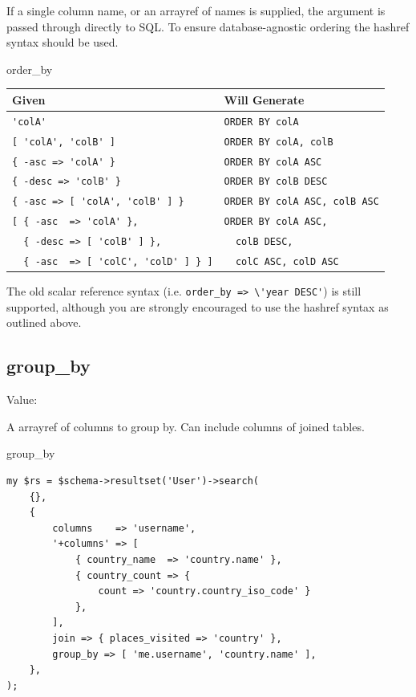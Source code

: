 If a single column name, or an arrayref of names is supplied, the argument
is passed through directly to SQL. To ensure database-agnostic ordering the
hashref syntax should be used.

\begin{frame}[fragile]{order\_by}
\begin{table}
\begin{tabular}{l | l}
Given & Will Generate \\
\hline
\footnotesize{\verb|'colA'|                         } & \footnotesize{\verb|ORDER BY colA|              } \\
\footnotesize{\verb|[ 'colA', 'colB' ]|             } & \footnotesize{\verb|ORDER BY colA, colB|        } \\
\footnotesize{\verb|{ -asc => 'colA' }|             } & \footnotesize{\verb|ORDER BY colA ASC|          } \\
\footnotesize{\verb|{ -desc => 'colB' }|            } & \footnotesize{\verb|ORDER BY colB DESC|         } \\
\footnotesize{\verb|{ -asc => [ 'colA', 'colB' ] }| } & \footnotesize{\verb|ORDER BY colA ASC, colB ASC|} \\
\footnotesize{\verb|[ { -asc  => 'colA' },|           } &   \footnotesize{\verb|ORDER BY colA ASC,|        } \\
\footnotesize{\verb|  { -desc => [ 'colB' ] },|       } &   \footnotesize{\verb|  colB DESC,|              } \\
\footnotesize{\verb|  { -asc  => [ 'colC', 'colD' ] } ]|} & \footnotesize{\verb|  colC ASC, colD ASC|      } \\
\end{tabular}
\end{table}
\end{frame}

The old scalar reference syntax (i.e. \verb|order_by => \'year DESC'|) is
still supported, although you are strongly encouraged to use the hashref
syntax as outlined above.

\subsection{group\_by}

Value: \@columns

A arrayref of columns to group by. Can include columns of joined tables.

\begin{frame}[fragile]{group\_by}
\begin{lstlisting}
my $rs = $schema->resultset('User')->search(
    {},
    {
        columns    => 'username',
        '+columns' => [ 
            { country_name  => 'country.name' },
            { country_count => {
                count => 'country.country_iso_code' }
            },
        ],
        join => { places_visited => 'country' },
        group_by => [ 'me.username', 'country.name' ],
    },
);
\end{lstlisting}
\end{frame}


